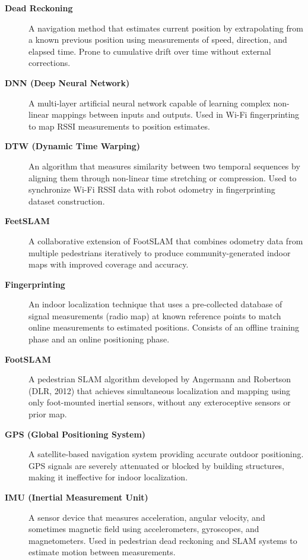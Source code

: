 \documentclass{ipgpmaster}
\begin{document}
\begin{description}
\item[\textbf{Dead Reckoning}]
A navigation method that estimates current position by extrapolating from a known previous position using measurements of speed, direction, and elapsed time. Prone to cumulative drift over time without external corrections.

\item[\textbf{DNN (Deep Neural Network)}]
A multi-layer artificial neural network capable of learning complex non-linear mappings between inputs and outputs. Used in Wi-Fi fingerprinting to map RSSI measurements to position estimates.

\item[\textbf{DTW (Dynamic Time Warping)}]
An algorithm that measures similarity between two temporal sequences by aligning them through non-linear time stretching or compression. Used to synchronize Wi-Fi RSSI data with robot odometry in fingerprinting dataset construction.

\item[\textbf{FeetSLAM}]
A collaborative extension of FootSLAM that combines odometry data from multiple pedestrians iteratively to produce community-generated indoor maps with improved coverage and accuracy.

\item[\textbf{Fingerprinting}]
An indoor localization technique that uses a pre-collected database of signal measurements (radio map) at known reference points to match online measurements to estimated positions. Consists of an offline training phase and an online positioning phase.

\item[\textbf{FootSLAM}]
A pedestrian SLAM algorithm developed by Angermann and Robertson (DLR, 2012) that achieves simultaneous localization and mapping using only foot-mounted inertial sensors, without any exteroceptive sensors or prior map.

\item[\textbf{GPS (Global Positioning System)}]
A satellite-based navigation system providing accurate outdoor positioning. GPS signals are severely attenuated or blocked by building structures, making it ineffective for indoor localization.

\item[\textbf{IMU (Inertial Measurement Unit)}]
A sensor device that measures acceleration, angular velocity, and sometimes magnetic field using accelerometers, gyroscopes, and magnetometers. Used in pedestrian dead reckoning and SLAM systems to estimate motion between measurements.


\end{description}
\end{document}
